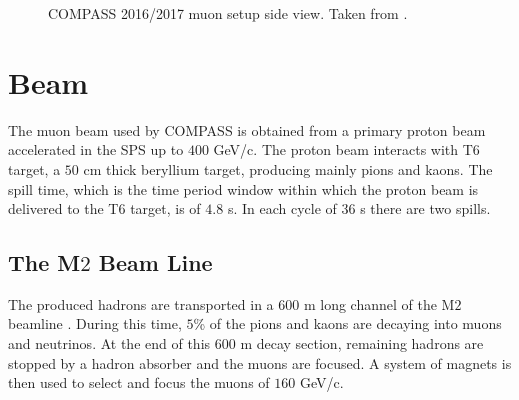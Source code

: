 \begin{figure}
  \centering
	\caption{COMPASS 2016/2017 muon setup side view. Taken from \cite{Setup}.}
	\label{pic:apparatus}
\end{figure}


\section{Beam}\label{sec:beam}

The muon beam used by COMPASS is obtained from a primary proton beam accelerated in the SPS up to $400$ GeV/c. The proton beam interacts with T6 target, a $50$ cm thick beryllium target, producing mainly pions and kaons. The spill time, which is the time period window within which the proton beam is delivered to the T6 target, is of $4.8$ s. In each cycle of $36$ s there are two spills.

\subsection{The M$2$ Beam Line}

The produced hadrons are transported in a $600$ m long channel of the M$2$ beamline \cite{NIM2015,M2Beam}. During this time, $5$\% of the pions and kaons are decaying into muons and neutrinos. At the end of this $600$ m decay section, remaining hadrons are stopped by a hadron absorber and the muons are focused. A system of magnets is then used to select and focus the muons of $160$ GeV/c.

